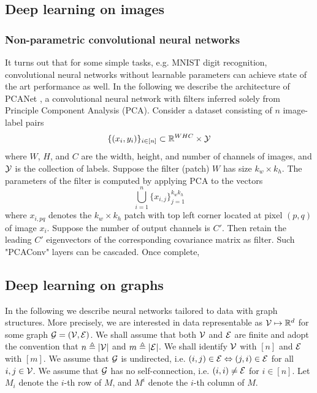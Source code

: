 \documentclass{article}
\begin{document}
\subsection{Deep learning on images}

\subsubsection{Non-parametric convolutional neural networks}

It turns out that for some simple tasks, e.g. MNIST digit recognition, convolutional neural networks without learnable parameters can achieve state of the art performance as well.
In the following we describe the architecture of PCANet \cite{chan2015pcanet}, a convolutional neural network with filters inferred solely from Principle Component Analysis (PCA).
Consider a dataset consisting of $n$ image-label pairs
\[
\{(x_i, y_i)\}_{i \in [n]} \subset {\mathbb R}^{W H C} \times {\mathcal Y}
\]
where $W$, $H$, and $C$ are the width, height, and number of channels of images, and ${\mathcal Y}$ is the collection of labels.
Suppose the filter (patch) $W$ has size $k_w \times k_h$.
The parameters of the filter is computed by applying PCA to the vectors
\[
\bigcup_{i = 1}^n \{x_{i, j}\}_{j = 1}^{k_w k_h}
\]
where $x_{i, pq}$ denotes the $k_w \times k_h$ patch with top left corner located at pixel $(p, q)$ of image $x_i$.
Suppose the number of output channels is $C'$.
Then retain the leading $C'$ eigenvectors of the corresponding covariance matrix as filter.
Such "PCAConv" layers can be cascaded.
Once complete,

\subsection{Deep learning on graphs}

In the following we describe neural networks tailored to data with graph structures.
More precisely, we are interested in data representable as ${\mathcal V} \mapsto {\mathbb R}^d$ for some graph ${\mathcal G} = ({\mathcal V}, {\mathcal E})$.
We shall assume that both ${\mathcal V}$ and ${\mathcal E}$ are finite and adopt the convention that $n \triangleq |{\mathcal V}|$ and $m \triangleq |{\mathcal E}|$.
We shall identify ${\mathcal V}$ with $[n]$ and ${\mathcal E}$ with $[m]$.
We assume that ${\mathcal G}$ is undirected, i.e. $(i, j) \in {\mathcal E} \Leftrightarrow (j, i) \in {\mathcal E}$ for all $i, j \in {\mathcal V}$.
We assume that ${\mathcal G}$ has no self-connection, i.e. $(i, i) \ne {\mathcal E}$ for $i \in [n]$.
Let $M_i$ denote the $i$-th row of $M$, and $M^i$ denote the $i$-th column of $M$.
\end{document}
